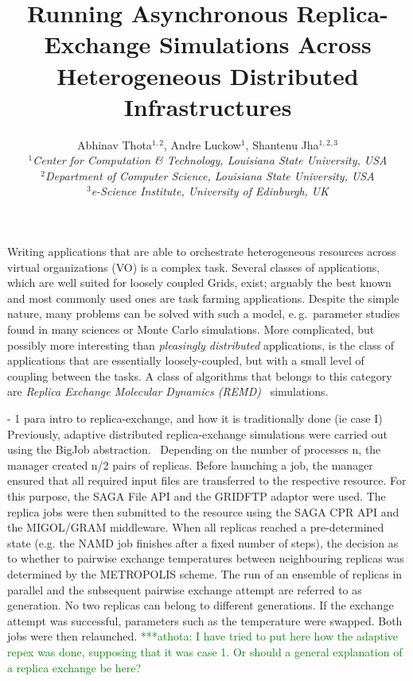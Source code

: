 \documentclass[a4paper,10pt]{article}
\newcommand{\athotanote}[1]{ {\textcolor{green} { ***athota: #1 }}}
\begin{document}
\title{\LARGE Running Asynchronous Replica-Exchange Simulations Across Heterogeneous Distributed Infrastructures}
 
\author{Abhinav Thota$^{1,2}$, Andre Luckow$^{1}$, Shantenu Jha$^{1,2,3}$\\
   \small{\emph{$^{1}$Center for Computation \& Technology, Louisiana State University, USA}}\\
   \small{\emph{$^{2}$Department of Computer Science, Louisiana State University, USA}}\\
   \small{\emph{$^{3}$e-Science Institute, University of Edinburgh, UK}}
   }
 
\maketitle
 
Writing applications that are able to orchestrate heterogeneous
resources across virtual organizations (VO) is a complex task.  Several 
classes of applications, which are well suited for loosely
coupled Grids, exist; arguably the best known and most commonly used ones are
task farming applications. Despite the simple nature, many problems
can be solved with such a model, e.\,g.\ parameter studies found in
many sciences or Monte Carlo simulations. More complicated, but possibly more 
interesting than {\it pleasingly  distributed} applications, is the class of applications that are
essentially loosely-coupled, but with a small level of coupling
between the tasks.  A class of algorithms that belongs to this category are
\emph{Replica Exchange Molecular Dynamics (REMD)}~\cite{hansmann,Sugita:1999rm} simulations. 
 
 
- 1 para intro to replica-exchange, and how it is traditionally done (ie case I)
Previously, adaptive distributed replica-exchange simulations were carried out using the BigJob abstraction.~\cite{Luckow et al. 2009}
 Depending on the number of processes n, the manager created n/2 pairs of replicas. Before launching a job, the manager
 ensured that all required input files are transferred to the respective
resource. For this purpose, the SAGA File API and the GRIDFTP adaptor were
used. The replica jobs were then submitted to the resource using the SAGA CPR
API and the MIGOL/GRAM middleware.
When all replicas reached a pre-determined state (e.g. the NAMD job finishes
after a fixed number of steps), the decision as to whether to pairwise exchange
temperatures between neighbouring replicas was determined by the METROPOLIS
scheme. The run of an ensemble of replicas in parallel and the subsequent
pairwise exchange attempt are referred to as generation. No two replicas can
belong to different generations. If the exchange attempt was successful, parameters
such as the temperature were swapped. Both jobs were then relaunched. 
 \athotanote{I have tried to put here how the adaptive repex was done, supposing that it was case 1. Or should a general
  explanation of a replica exchange be here?}
 
\end{document}
